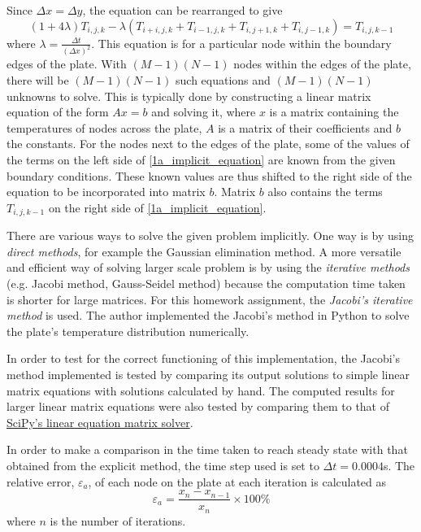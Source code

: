 \documentclass[a4paper]{article}
\begin{document}
		Since $\Delta x = \Delta y$, the equation can be rearranged to give
		\begin{equation}
			(1 + 4\lambda)T_{i,j,k} - \lambda(T_{i+i,j,k} + T_{i-1,j,k} + T_{i,j+1,k} + T_{i,j-1,k})
			=
			T_{i,j,k-1}
			\label{1a_implicit_equation}
		\end{equation}
		where $\displaystyle{\lambda = \frac{\Delta t}{(\Delta x)^2}}$. This equation is for a particular node within the boundary edges of the plate. With $(M-1)(N-1)$ nodes within the edges of the plate, there will be $(M-1)(N-1)$ such equations and $(M-1)(N-1)$ unknowns to solve. This is typically done by constructing a linear matrix equation of the form $Ax=b$ and solving it, where $x$ is a matrix containing the temperatures of nodes across the plate, $A$ is a matrix of their coefficients and $b$ the constants. For the nodes next to the edges of the plate, some of the values of the terms on the left side of \autoref{1a_implicit_equation} are known from the given boundary conditions. These known values are thus shifted to the right side of the equation to be incorporated into matrix $b$. Matrix $b$ also contains the terms $T_{i,j,k-1}$ on the right side of \autoref{1a_implicit_equation}.
		
		There are various ways to solve the given problem implicitly. One way is by using \textit{direct methods}, for example the Gaussian elimination method. A more versatile and efficient way of solving larger scale problem is by using the \textit{iterative methods} (e.g. Jacobi method, Gauss-Seidel method) because the computation time taken is shorter for large matrices. For this homework assignment, the \emph{Jacobi's iterative method} is used. The author implemented the Jacobi's method in Python to solve the plate's temperature distribution numerically.
		
		
		In order to test for the correct functioning of this implementation, the Jacobi's method implemented is tested by comparing its output solutions to simple linear matrix equations with solutions calculated by hand. The computed results for larger linear matrix equations were also tested by comparing them to that of \href{https://docs.scipy.org/doc/numpy/reference/generated/numpy.linalg.solve.html}{SciPy's linear equation matrix solver}.
		
		In order to make a comparison in the time taken to reach steady state with that obtained from the explicit method, the time step used is set to $\Delta t=0.0004$s. The relative error, $\varepsilon_a$, of each node on the plate at each iteration is calculated as
		\begin{equation}
			\varepsilon_a = \frac{x_n - x_{n-1}}{x_n}\times 100\%
			\label{relative_error_formula}
		\end{equation}
		where $n$ is the number of iterations.
		
\end{document}
